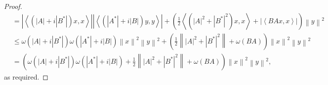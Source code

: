 \documentclass[12pt,twoside,reqno]{amsart}
\numberwithin{equation}{section}
\begin{document}
\begin{proof}
\[\begin{aligned}
 & =\left| \left\langle \left( \left| A \right|+i\left| {{B}^{*}} \right| \right)x,x \right\rangle  \right|\left| \left\langle \left( \left| {{A}^{*}} \right|+i\left| B \right| \right)y,y \right\rangle  \right|+\left( \frac{1}{2}\left\langle \left( {{\left| A \right|}^{2}}+{{\left| {{B}^{*}} \right|}^{2}} \right)x,x \right\rangle +\left| \left\langle BAx,x \right\rangle  \right| \right){{\left\| y \right\|}^{2}} \\ 
 & \le \omega \left( \left| A \right|+i\left| {{B}^{*}} \right| \right)\omega \left( \left| {{A}^{*}} \right|+i\left| B \right| \right){{\left\| x \right\|}^{2}}{{\left\| y \right\|}^{2}}+\left( \frac{1}{2}\left\| {{\left| A \right|}^{2}}+{{\left| {{B}^{*}} \right|}^{2}} \right\|+\omega \left( BA \right) \right){{\left\| x \right\|}^{2}}{{\left\| y \right\|}^{2}} \\ 
 & =\left( \omega \left( \left| A \right|+i\left| {{B}^{*}} \right| \right)\omega \left( \left| {{A}^{*}} \right|+i\left| B \right| \right)+\frac{1}{2}\left\| {{\left| A \right|}^{2}}+{{\left| {{B}^{*}} \right|}^{2}} \right\|+\omega \left( BA \right) \right){{\left\| x \right\|}^{2}}{{\left\| y \right\|}^{2}}, 
\end{aligned}\]
as required.
\end{proof}
\end{document}
